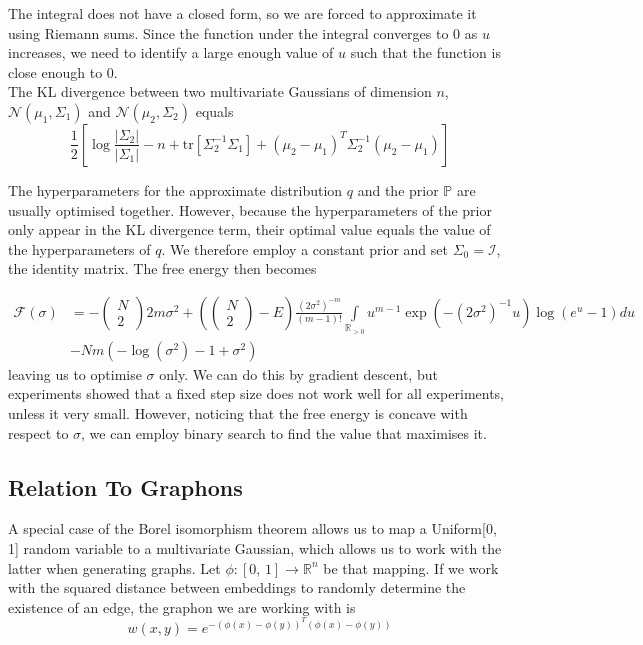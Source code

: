 \documentclass[12pt]{report}
\newcommand{\mc}[1]{\mathcal{#1}}
\newcommand{\mb}[1]{\mathbb{#1}}
\newcommand{\half}{\frac{1}{2}}
\newcommand{\comb}[2]{\begin{pmatrix}#1 \\ #2\end{pmatrix}}
\begin{document}
The integral does not have a closed form, so we are forced to approximate it using Riemann sums. Since the function under the integral converges to 0 as $u$ increases, we need to identify a large enough value of $u$ such that the function is close enough to $0$. \\

The KL divergence between two multivariate Gaussians of dimension $n$, $\mc{N}(\mu_1, \Sigma_1)$ and $\mc{N}(\mu_2, \Sigma_2)$ equals
\begin{equation}
    \half\left[\log\frac{|\Sigma_2|}{|\Sigma_1|} - n + \text{tr}[\Sigma_2^{-1}\Sigma_1] + (\mu_2 - \mu_1)^T\Sigma_2^{-1}(\mu_2 - \mu_1)\right]
\end{equation}

The hyperparameters for the approximate distribution $q$ and the prior $\mb{P}$ are usually optimised together. However, because the hyperparameters of the prior only appear in the KL divergence term, their optimal value equals the value of the hyperparameters of $q$. We therefore employ a constant prior and set $\Sigma_0 = \mc{I}$, the identity matrix. The free energy then becomes

\begin{align*}
    \mc{F}(\sigma) &= -\comb{N}{2}2m\sigma^2 + \left(\comb{N}{2} - E\right)\frac{(2\sigma^2)^{-m}}{(m-1)!}\int\limits_{\mb{R}_{>0}} u^{m-1}\exp(-(2\sigma^2)^{-1}u) \log(e^{u} - 1) du \\
    &- Nm(-\log(\sigma^2) - 1 + \sigma^2)
\end{align*}
leaving us to optimise $\sigma$ only. We can do this by gradient descent, but experiments showed that a fixed step size does not work well for all experiments, unless it very small. However, noticing that the free energy is concave with respect to $\sigma$, we can employ binary search to find the value that maximises it. \\

\subsection{Relation To Graphons}

A special case of the Borel isomorphism theorem allows us to map a Uniform[0, 1] random variable to a multivariate Gaussian, which allows us to work with the latter when generating graphs. Let $\phi : [0,\,1] \rightarrow \mb{R}^n$ be that mapping. If we work with the squared distance between embeddings to randomly determine the existence of an edge, the graphon we are working with is
\begin{equation}
    w(x, y) = e^{-(\phi (x) - \phi (y))^T(\phi (x) - \phi (y))}
\end{equation}
\end{document}
